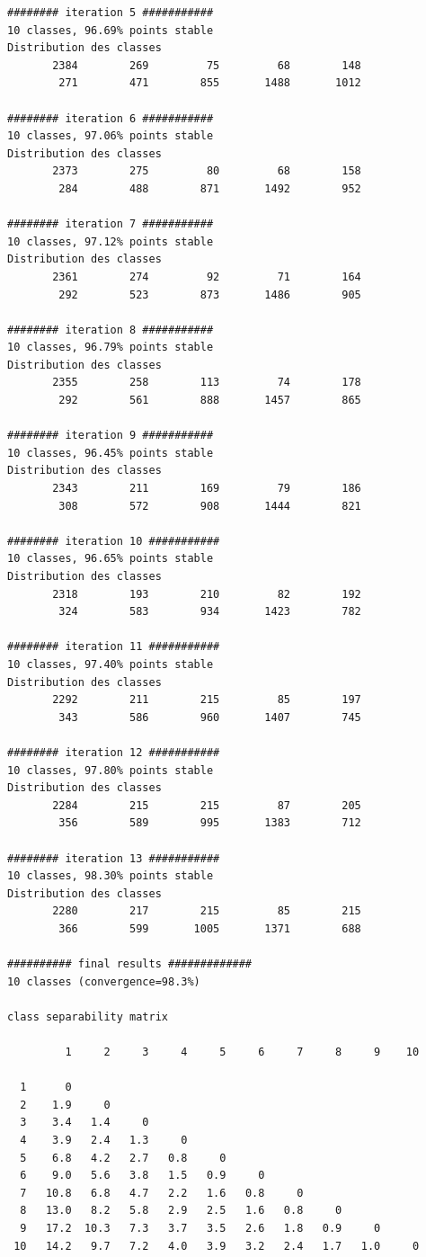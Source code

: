 \documentclass[earth,article,submit,pdftex,moreauthors]{Definitions/mdpi}
\begin{document}
\begin{scriptsize}
\begin{verbatim}
######## iteration 5 ###########
10 classes, 96.69% points stable
Distribution des classes
       2384        269         75         68        148
        271        471        855       1488       1012

######## iteration 6 ###########
10 classes, 97.06% points stable
Distribution des classes
       2373        275         80         68        158
        284        488        871       1492        952

######## iteration 7 ###########
10 classes, 97.12% points stable
Distribution des classes
       2361        274         92         71        164
        292        523        873       1486        905

######## iteration 8 ###########
10 classes, 96.79% points stable
Distribution des classes
       2355        258        113         74        178
        292        561        888       1457        865

######## iteration 9 ###########
10 classes, 96.45% points stable
Distribution des classes
       2343        211        169         79        186
        308        572        908       1444        821

######## iteration 10 ###########
10 classes, 96.65% points stable
Distribution des classes
       2318        193        210         82        192
        324        583        934       1423        782

######## iteration 11 ###########
10 classes, 97.40% points stable
Distribution des classes
       2292        211        215         85        197
        343        586        960       1407        745

######## iteration 12 ###########
10 classes, 97.80% points stable
Distribution des classes
       2284        215        215         87        205
        356        589        995       1383        712

######## iteration 13 ###########
10 classes, 98.30% points stable
Distribution des classes
       2280        217        215         85        215
        366        599       1005       1371        688

########## final results #############
10 classes (convergence=98.3%)

class separability matrix

         1     2     3     4     5     6     7     8     9    10

  1      0
  2    1.9     0
  3    3.4   1.4     0
  4    3.9   2.4   1.3     0
  5    6.8   4.2   2.7   0.8     0
  6    9.0   5.6   3.8   1.5   0.9     0
  7   10.8   6.8   4.7   2.2   1.6   0.8     0
  8   13.0   8.2   5.8   2.9   2.5   1.6   0.8     0
  9   17.2  10.3   7.3   3.7   3.5   2.6   1.8   0.9     0
 10   14.2   9.7   7.2   4.0   3.9   3.2   2.4   1.7   1.0     0


\end{verbatim}
\end{scriptsize}
\end{document}
